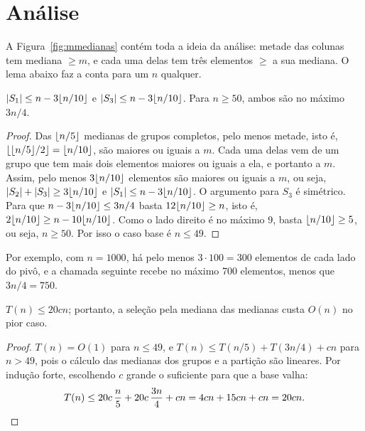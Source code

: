 \section{Análise}\label{sec:mmanalise}
A Figura~\ref{fig:mmedianas} contém toda a ideia da análise: metade das colunas tem mediana $\ge m$, e cada uma delas tem três elementos $\ge$ a sua mediana. O lema abaixo faz a conta para um $n$ qualquer.
\begin{lema}
$|S_1|\le n-3\lfloor n/10\rfloor$ e $|S_3|\le n-3\lfloor n/10\rfloor$. Para $n\ge50$, ambos são no máximo $3n/4$.
\end{lema}
\begin{proof}
Das $\lfloor n/5\rfloor$ medianas de grupos completos, pelo menos metade, isto é, $\lfloor\lfloor n/5\rfloor/2\rfloor=\lfloor n/10\rfloor$, são maiores ou iguais a $m$. Cada uma delas vem de um grupo que tem mais dois elementos maiores ou iguais a ela, e portanto a $m$. Assim, pelo menos $3\lfloor n/10\rfloor$ elementos são maiores ou iguais a $m$, ou seja, $|S_2|+|S_3|\ge3\lfloor n/10\rfloor$ e $|S_1|\le n-3\lfloor n/10\rfloor$. O argumento para $S_3$ é simétrico.
Para que $n-3\lfloor n/10\rfloor\le3n/4$ basta $12\lfloor n/10\rfloor\ge n$, isto é, $2\lfloor n/10\rfloor\ge n-10\lfloor n/10\rfloor$. Como o lado direito é no máximo 9, basta $\lfloor n/10\rfloor\ge5$, ou seja, $n\ge50$. Por isso o caso base é $n\le49$.
\end{proof}
Por exemplo, com $n=1000$, há pelo menos $3\cdot100=300$ elementos de cada lado do pivô, e a chamada seguinte recebe no máximo 700 elementos, menos que $3n/4=750$.

\begin{teo}
$T(n)\le 20cn$; portanto, a seleção pela mediana das medianas custa $O(n)$ no pior caso.
\end{teo}
\begin{proof}
$T(n)=O(1)$ para $n\le49$, e $T(n)\le T(n/5)+T(3n/4)+cn$ para $n>49$, pois o cálculo das medianas dos grupos e a partição são lineares. Por indução forte, escolhendo $c$ grande o suficiente para que a base valha:
\[
T(n)\le 20c\,\frac n5+20c\,\frac{3n}{4}+cn=4cn+15cn+cn=20cn.\qedhere
\]
\end{proof}

